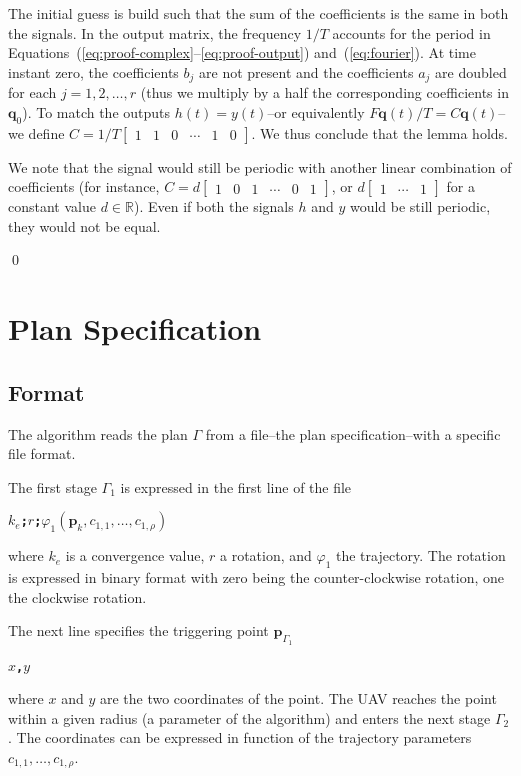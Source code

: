 \documentclass[letterpaper,10pt,conference]{ieeeconf}
\theoremstyle{definition}
\begin{document}
The initial guess is build such that the sum of the coefficients is the same in both the signals. In the output matrix, the frequency $1/T$ accounts for the period in Equations~(\ref{eq:proof-complex}--\ref{eq:proof-output}) and~(\ref{eq:fourier}). At time instant zero, the coefficients $b_j$ are not present and the coefficients $a_j$ are doubled for each $j=1,2,\dots,r$ (thus we multiply by a half the corresponding coefficients in $\mathbf{q}_0$). To match the outputs $h(t)=y(t)$--or equivalently $F\mathbf{q}(t)/T=C\mathbf{q}(t)$--we define $C=1/T\begin{bmatrix}1 & 1 & 0 & \cdots & 1 & 0\end{bmatrix}$. We thus conclude that the lemma holds.

We note that the signal would still be periodic with another linear combination of coefficients (for instance, $C=d\begin{bmatrix}1 & 0 & 1 & \cdots & 0 & 1\end{bmatrix}$, or $d\begin{bmatrix}1 & \cdots & 1\end{bmatrix}$ for a constant value $d\in\mathbb{R}$). Even if both the signals $h$ and $y$ would be still periodic, they would not be equal.

\qed


\section{Plan Specification}
\label{app:plan-spec}

\subsection{Format}

The algorithm reads the plan $\Gamma$ from a file--the plan specification--with a specific file format.

The first stage $\Gamma_1$ is expressed in the first line of the file
\begin{algorithmic}[1]
  \State\textbf{\texttt{$k_e$;$r$;$\varphi_1(\mathbf{p}_k,c_{1,1},\dots,c_{1,\rho})$}}\label{code:stage}
\end{algorithmic}
where $k_e$ is a convergence value, $r$ a rotation, and $\varphi_1$ the trajectory. The rotation is expressed in binary format with zero being the counter-clockwise rotation, one the clockwise rotation.

The next line specifies the triggering point $\mathbf{p}_{\Gamma_1}$
\begin{algorithmic}[1]
  \State\textbf{\texttt{$x$,$y$}}\label{code:trigger-pt}
\end{algorithmic}
where $x$ and $y$ are the two coordinates of the point. The UAV reaches the point within a given radius (a parameter of the algorithm) and enters the next stage $\Gamma_2$. The coordinates can be expressed in function of the trajectory parameters $c_{1,1},\dots,c_{1,\rho}$.
\end{document}
